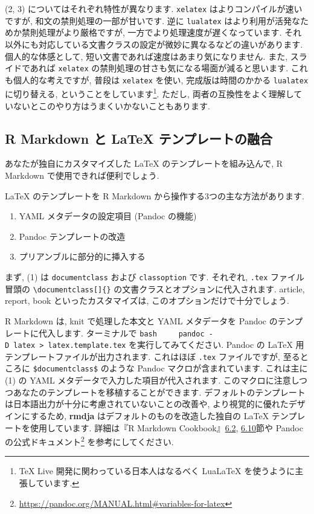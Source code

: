 \documentclass[
]{bxjsarticle}
\providecommand{\tightlist}{%
  \setlength{\itemsep}{0pt}\setlength{\parskip}{0pt}}
\begin{document}
(2, 3) についてはそれぞれ特性が異なります. \texttt{xelatex} はよりコンパイルが速いですが, 和文の禁則処理の一部が甘いです. 逆に \texttt{lualatex} はより利用が活発なためか禁則処理がより厳格ですが, 一方でより処理速度が遅くなっています. それ以外にも対応している文書クラスの設定が微妙に異なるなどの違いがあります. 個人的な体感として, 短い文書であれば速度はあまり気になりません. また, スライドであれば \texttt{xelatex} の禁則処理の甘さも気になる場面が減ると思います. これも個人的な考えですが, 普段は \texttt{xelatex} を使い, 完成版は時間のかかる \texttt{lualatex} に切り替える, ということをしています\footnote{TeX Live 開発に関わっている日本人はなるべく LuaLaTeX を使うように主張しています.}. ただし, 両者の互換性をよく理解していないとこのやり方はうまくいかないこともあります.

\hypertarget{r-markdown-ux3068-latex-ux30c6ux30f3ux30d7ux30ecux30fcux30c8ux306eux878dux5408}{%
\subsection{R Markdown と LaTeX テンプレートの融合}\label{r-markdown-ux3068-latex-ux30c6ux30f3ux30d7ux30ecux30fcux30c8ux306eux878dux5408}}

あなたが独自にカスタマイズした LaTeX のテンプレートを組み込んで, R Markdown で使用できれば便利でしょう.

LaTeX のテンプレートを R Markdown から操作する3つの主な方法があります.

\begin{enumerate}
\def\labelenumi{\arabic{enumi}.}
\tightlist
\item
  YAML メタデータの設定項目 (Pandoc の機能)
\item
  Pandoc テンプレートの改造
\item
  プリアンブルに部分的に挿入する
\end{enumerate}

まず, (1) は \texttt{documentclass} および \texttt{classoption} です. それぞれ, \texttt{.tex} ファイル冒頭の \texttt{\textbackslash{}documentclass{[}{]}\{\}} の文書クラスとオプションに代入されます. article, report, book といったカスタマイズは, このオプションだけで十分でしょう.

R Markdown は, knit で処理した本文と YAML メタデータを Pandoc のテンプレートに代入します. ターミナルで
\texttt{bash\ \ \ \ \ pandoc\ -D\ latex\ \textgreater{}\ latex.template.tex}
を実行してみてください. Pandoc の LaTeX 用テンプレートファイルが出力されます. これはほぼ \texttt{.tex} ファイルですが, 至るところに \texttt{\$documentclass\$} のような Pandoc マクロが含まれています. これは主に (1) の YAML メタデータで入力した項目が代入されます. このマクロに注意しつつあなたのテンプレートを移植することができます. デフォルトのテンプレートは日本語出力が十分に考慮されていないことの改善や, より視覚的に優れたデザインにするため, \textbf{rmdja} はデフォルトのものを改造した独自の LaTeX テンプレートを使用しています. 詳細は『R Markdown Cookbook』\href{https://gedevan-aleksizde.github.io/rmarkdown-cookbook/latex-variables.html}{6.2}, \href{https://gedevan-aleksizde.github.io/rmarkdown-cookbook/latex-template.html}{6.10}節や Pandoc の公式ドキュメント\footnote{\url{https://pandoc.org/MANUAL.html\#variables-for-latex}} を参考にしてください.
\end{document}
